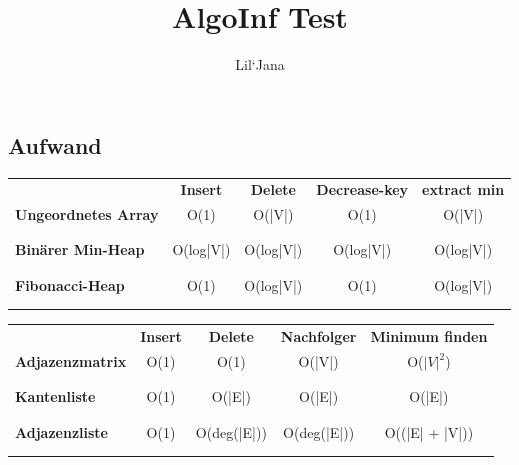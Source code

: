 \documentclass{article}
\title{AlgoInf Test}
\author{Lil`Jana}
\begin{document}
\section{}
\subsection{Aufwand}
\begin{table}[H]
    \begin{tabular}{ p{5cm} | c c c c }
          & \textbf{Insert} & \textbf{Delete} & \textbf{Decrease-key} & \textbf{extract min} \\
        \textbf{Ungeordnetes Array} & O(1) & O(|V|) & O(1) & O(|V|)  \\ \\ \\
        \textbf{Binärer Min-Heap} & O(log|V|) & O(log|V|) & O(log|V|) & O(log|V|) \\ \\ \\
        \textbf{Fibonacci-Heap} & O(1) & O(log|V|) & O(1) & O(log|V|)  \\ \\ \\
    \end{tabular}
    \label{tab:my_label}
\end{table}

\begin{table}[H]
    \begin{tabular}{ p{5cm} | c c c c}
         & \textbf{Insert} & \textbf{Delete} & \textbf{Nachfolger} & \textbf{Minimum finden} \\ 
         \textbf{Adjazenzmatrix} & O(1) & O(1) &  O(|V|) & O($|V|^2$) \\ \\ \\
        \textbf{Kantenliste} & O(1) & O(|E|) &   O(|E|)  &  O(|E|)\\ \\ \\ 
        \textbf{Adjazenzliste} & O(1) & O(deg(|E|)) & O(deg(|E|)) & O((|E| + |V|))  \\ \\ \\
    \end{tabular}
    \label{tab:my_label} 
\end{table}
\end{document}
